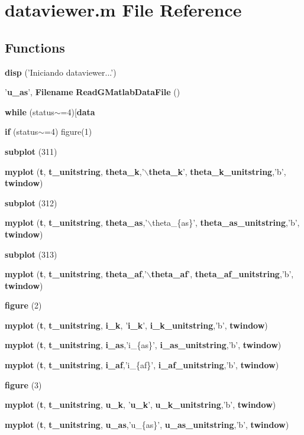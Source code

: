 \section{dataviewer.m File Reference}
\label{matlab_2dataviewer_8m}
\subsection*{Functions}
\begin{DoxyCompactItemize}
\item 
{\bf disp} ('Iniciando dataviewer...')
\item 
'{\bf u\_\-as}', {\bf Filename} {\bf ReadGMatlabDataFile} ()
\item 
{\bf while} (status$\sim$=4)[{\bf data}
\item 
{\bf if} (status$\sim$=4) figure(1)
\item 
{\bf subplot} (311)
\item 
{\bf myplot} ({\bf t}, {\bf t\_\-unitstring}, {\bf theta\_\-k},'$\backslash${\bf theta\_\-k}', {\bf theta\_\-k\_\-unitstring},'b', {\bf twindow})
\item 
{\bf subplot} (312)
\item 
{\bf myplot} ({\bf t}, {\bf t\_\-unitstring}, {\bf theta\_\-as},'$\backslash$theta\_\-\{as\}', {\bf theta\_\-as\_\-unitstring},'b', {\bf twindow})
\item 
{\bf subplot} (313)
\item 
{\bf myplot} ({\bf t}, {\bf t\_\-unitstring}, {\bf theta\_\-af},'$\backslash${\bf theta\_\-af}', {\bf theta\_\-af\_\-unitstring},'b', {\bf twindow})
\item 
{\bf figure} (2)
\item 
{\bf myplot} ({\bf t}, {\bf t\_\-unitstring}, {\bf i\_\-k}, '{\bf i\_\-k}', {\bf i\_\-k\_\-unitstring},'b', {\bf twindow})
\item 
{\bf myplot} ({\bf t}, {\bf t\_\-unitstring}, {\bf i\_\-as},'i\_\-\{as\}', {\bf i\_\-as\_\-unitstring},'b', {\bf twindow})
\item 
{\bf myplot} ({\bf t}, {\bf t\_\-unitstring}, {\bf i\_\-af},'i\_\-\{af\}', {\bf i\_\-af\_\-unitstring},'b', {\bf twindow})
\item 
{\bf figure} (3)
\item 
{\bf myplot} ({\bf t}, {\bf t\_\-unitstring}, {\bf u\_\-k}, '{\bf u\_\-k}', {\bf u\_\-k\_\-unitstring},'b', {\bf twindow})
\item 
{\bf myplot} ({\bf t}, {\bf t\_\-unitstring}, {\bf u\_\-as},'u\_\-\{as\}', {\bf u\_\-as\_\-unitstring},'b', {\bf twindow})

\end{DoxyCompactItemize}
